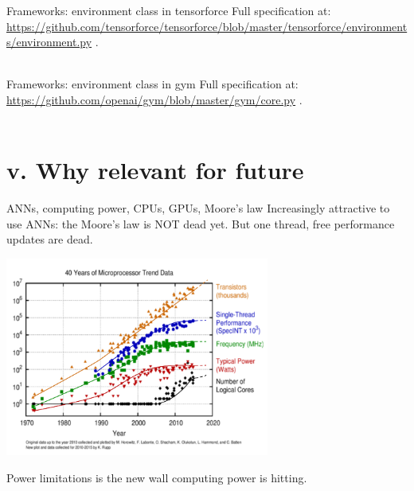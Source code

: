 \documentclass{beamer}
\begin{document}
\begin{frame}{Frameworks: environment class in tensorforce}
    Full specification at: \url{https://github.com/tensorforce/tensorforce/blob/master/tensorforce/environments/environment.py} . \\~\\
    
    \tiny{
        
    }
\end{frame}

\begin{frame}{Frameworks: environment class in gym}
    Full specification at: \url{https://github.com/openai/gym/blob/master/gym/core.py} . \\~\\

    \tiny{
        
    }
\end{frame}


\section{v. Why relevant for future}

\begin{frame}{ANNs, computing power, CPUs, GPUs, Moore's law}
    Increasingly attractive to use ANNs: the Moore's law is NOT dead yet. But one thread, free performance updates are dead.

    \begin{center}
      \includegraphics[width=0.65\textwidth]{./Figures/CPUs_vs_GPUs/40_years_trend}
    \end{center}

    Power limitations is the new wall computing power is hitting.
\end{frame}
\end{document}
